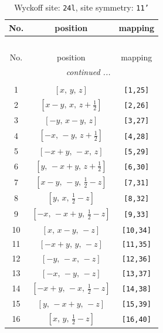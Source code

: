 \documentclass[fleqn,8pt]{jsarticle}
\begin{document}
\begin{longtable}{ccc}
\caption{Wyckoff site: {\tt 24l}, site symmetry: {\tt 11'}}
 \\
 \hline \hline
No. & position & mapping \\ \hline \endfirsthead

\multicolumn{2}{l}{\tablename\ \thetable{}} \\
 \hline \hline
No. & position & mapping \\ \hline \endhead

 \hline \hline
\multicolumn{2}{r}{\footnotesize\it continued ...} \\ \endfoot

 \hline \hline
\multicolumn{2}{r}{} \\ \endlastfoot

1 & $\left[ x,\, y,\, z \right]$ & {\tt [1,25]} \\ \hline
2 & $\left[ x - y,\, x,\, z + \frac{1}{2} \right]$ & {\tt [2,26]} \\ \hline
3 & $\left[ - y,\, x - y,\, z \right]$ & {\tt [3,27]} \\ \hline
4 & $\left[ - x,\, - y,\, z + \frac{1}{2} \right]$ & {\tt [4,28]} \\ \hline
5 & $\left[ - x + y,\, - x,\, z \right]$ & {\tt [5,29]} \\ \hline
6 & $\left[ y,\, - x + y,\, z + \frac{1}{2} \right]$ & {\tt [6,30]} \\ \hline
7 & $\left[ x - y,\, - y,\, \frac{1}{2} - z \right]$ & {\tt [7,31]} \\ \hline
8 & $\left[ y,\, x,\, \frac{1}{2} - z \right]$ & {\tt [8,32]} \\ \hline
9 & $\left[ - x,\, - x + y,\, \frac{1}{2} - z \right]$ & {\tt [9,33]} \\ \hline
10 & $\left[ x,\, x - y,\, - z \right]$ & {\tt [10,34]} \\ \hline
11 & $\left[ - x + y,\, y,\, - z \right]$ & {\tt [11,35]} \\ \hline
12 & $\left[ - y,\, - x,\, - z \right]$ & {\tt [12,36]} \\ \hline
13 & $\left[ - x,\, - y,\, - z \right]$ & {\tt [13,37]} \\ \hline
14 & $\left[ - x + y,\, - x,\, \frac{1}{2} - z \right]$ & {\tt [14,38]} \\ \hline
15 & $\left[ y,\, - x + y,\, - z \right]$ & {\tt [15,39]} \\ \hline
16 & $\left[ x,\, y,\, \frac{1}{2} - z \right]$ & {\tt [16,40]} \\ \hline

\end{longtable}
\end{document}
